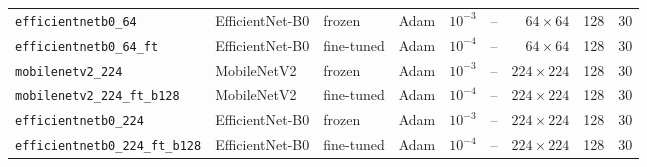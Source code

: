 \begin{table}[H]
{\begin{tabular}{lllllrrrr}
    \texttt{efficientnetb0\_64}          & EfficientNet-B0 & frozen     & Adam & $10^{-3}$ & -- & $64\times64$   & 128 & 30 \\
    \texttt{efficientnetb0\_64\_ft}      & EfficientNet-B0 & fine-tuned & Adam & $10^{-4}$ & -- & $64\times64$   & 128 & 30 \\
    \texttt{mobilenetv2\_224}            & MobileNetV2     & frozen     & Adam & $10^{-3}$ & -- & $224\times224$ & 128 & 30 \\
    \texttt{mobilenetv2\_224\_ft\_b128}  & MobileNetV2     & fine-tuned & Adam & $10^{-4}$ & -- & $224\times224$ & 128 & 30 \\
    \texttt{efficientnetb0\_224}         & EfficientNet-B0 & frozen     & Adam & $10^{-3}$ & -- & $224\times224$ & 128 & 30 \\
    \texttt{efficientnetb0\_224\_ft\_b128} & EfficientNet-B0 & fine-tuned & Adam & $10^{-4}$ & -- & $224\times224$ & 128 & 30 \\
    \bottomrule
  \end{tabular}}
\end{table}

